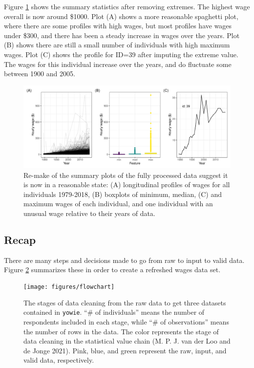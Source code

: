 \documentclass{article}
\begin{document}
Figure \ref{fig:fixed-feature-plot} shows the summary statistics after removing extremes. The highest wage overall is now around \$1000. Plot (A) shows a more reasonable spaghetti plot, where there are some profiles with high wages, but most profiles have wages under \$300, and there has been a steady increase in wages over the years. Plot (B) shows there are still a small number of individuals with high maximum wages. Plot (C) shows the profile for ID=39 after imputing the extreme value. The wages for this individual increase over the years, and do fluctuate some between 1900 and 2005.

\begin{figure}

{\centering \includegraphics[width=1\linewidth]{figures/fixed-feature-plot-1} 

}

\caption{Re-make of the summary plots of the fully processed data suggest it is now in a reasonable state: (A) longitudinal profiles of wages for all individuals 1979-2018, (B) boxplots of minimum, median, (C) and maximum wages of each individual, and one individual with an unusual wage relative to their years of data. }\label{fig:fixed-feature-plot}
\end{figure}

\hypertarget{recap}{%
\subsection{Recap}\label{recap}}

There are many steps and decisions made to go from raw to input to valid data. Figure \ref{fig:flow-chart} summarizes these in order to create a refreshed wages data set.



\begin{figure}

{\centering \texttt{[image: figures/flowchart]} 

}

\caption{The stages of data cleaning from the raw data to get three datasets contained in \texttt{yowie}. ``\# of individuals'' means the number of respondents included in each stage, while ``\# of observations'' means the number of rows in the data. The color represents the stage of data cleaning in the statistical value chain (M. P. J. van der Loo and de Jonge 2021). Pink, blue, and green represent the raw, input, and valid data, respectively.}\label{fig:flow-chart}
\end{figure}
\end{document}

